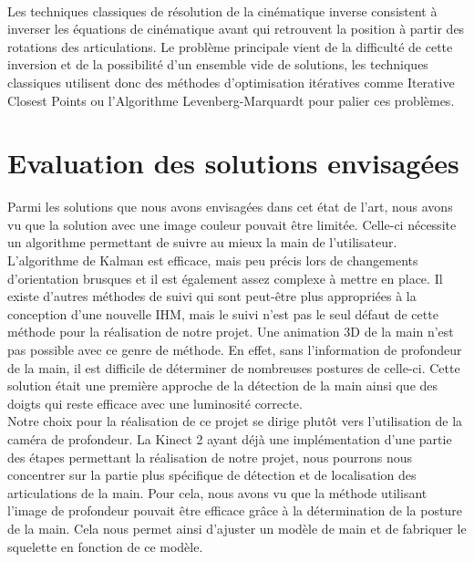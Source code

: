 \paragraph{}
Les techniques classiques de résolution de la cinématique inverse consistent à inverser les équations de cinématique avant qui retrouvent la position à partir des rotations des articulations.
Le problème principale vient de la difficulté de cette inversion et de la possibilité d'un ensemble vide de solutions, les techniques classiques utilisent donc des méthodes d'optimisation itératives comme Iterative Closest Points ou l'Algorithme Levenberg-Marquardt pour palier ces problèmes.

\section{Evaluation des solutions envisagées}
Parmi les solutions que nous avons envisagées dans cet état de l'art, nous avons vu que la solution avec une
image couleur pouvait être limitée. Celle-ci nécessite un algorithme permettant de suivre au mieux
la main de l'utilisateur. L'algorithme de Kalman est efficace, mais peu précis lors de changements d'orientation
brusques et il est également assez complexe à mettre en place. Il existe d'autres méthodes de suivi qui sont
peut-être plus appropriées à la conception d'une nouvelle IHM, mais le suivi n'est pas le seul défaut de cette
méthode pour la réalisation de notre projet. Une
animation 3D de la main n'est pas possible avec ce genre de méthode. En effet, sans l'information de
profondeur de la main, il est difficile de déterminer de nombreuses postures de celle-ci. Cette solution était une première approche de la
détection de la main ainsi que des doigts qui reste efficace avec une luminosité correcte.\\

Notre choix pour la réalisation de ce projet se dirige plutôt vers l'utilisation de la caméra de profondeur.
La Kinect 2 ayant déjà une implémentation d'une partie des étapes permettant la réalisation de notre projet, nous pourrons
nous concentrer sur la partie plus spécifique de détection et de localisation des articulations de la main.
Pour cela, nous avons vu que la méthode utilisant l'image de profondeur pouvait être efficace grâce à la
détermination de la posture de la main. Cela nous permet ainsi d'ajuster un modèle de main et de fabriquer
le squelette en fonction de ce modèle.\\
